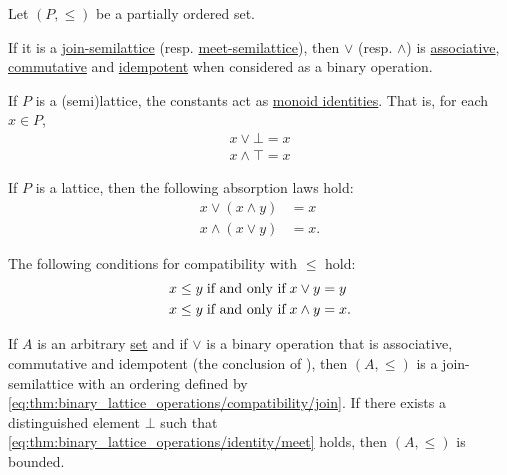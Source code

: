 \begin{proposition}\label{thm:binary_lattice_operations}
  Let \( (P, \leq) \) be a partially ordered set.

  \begin{thmenum}
     If it is a \hyperref[def:semilattice/join]{join-semilattice} (resp. \hyperref[def:semilattice/meet]{meet-semilattice}), then \( \vee \) (resp. \( \wedge \)) is \hyperref[def:magma/associative]{associative}, \hyperref[def:magma/commutative]{commutative} and \hyperref[def:magma/idempotent]{idempotent} when considered as a binary operation.

     If \( P \) is a (semi)lattice, the constants act as \hyperref[def:monoid]{monoid identities}. That is, for each \( x \in P \),
    \begin{align}
      x \vee \bot = x \label{eq:thm:binary_lattice_operations/identity/join} \\
      x \wedge \top = x \label{eq:thm:binary_lattice_operations/identity/meet}
    \end{align}

     If \( P \) is a lattice, then the following absorption laws hold:
    \begin{align}
      x \vee (x \wedge y) &= x \label{eq:thm:binary_lattice_operations/absorption/join} \\
      x \wedge (x \vee y) &= x \label{eq:thm:binary_lattice_operations/absorption/meet}.
    \end{align}

     The following conditions for compatibility with \( \leq \) hold:
    \begin{align}
      x \leq y &\T{if and only if} x \vee y = y \label{eq:thm:binary_lattice_operations/compatibility/join} \\
      x \leq y &\T{if and only if} x \wedge y = x \label{eq:thm:binary_lattice_operations/compatibility/meet}.
    \end{align}

     If \( A \) is an arbitrary \hyperref[def:set]{set} and if \( \vee \) is a binary operation that is associative, commutative and idempotent (the conclusion of ), then \( (A, \leq) \) is a join-semilattice with an ordering defined by \eqref{eq:thm:binary_lattice_operations/compatibility/join}. If there exists a distinguished element \( \bot \) such that \eqref{eq:thm:binary_lattice_operations/identity/meet} holds, then \( (A, \leq) \) is bounded.


\end{thmenum}
\end{proposition}
